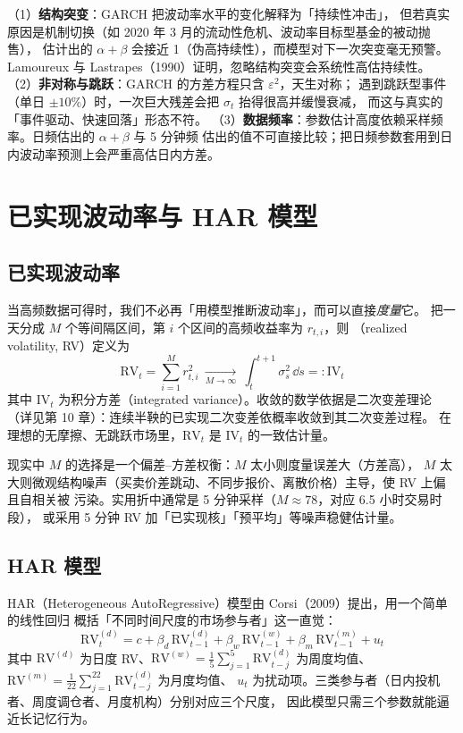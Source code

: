 \begin{warningbox}
（1）\textbf{结构突变}：GARCH 把波动率水平的变化解释为「持续性冲击」，
但若真实原因是机制切换（如 2020 年 3 月的流动性危机、波动率目标型基金的被动抛售），
估计出的 $\alpha+\beta$ 会接近 1（伪高持续性），而模型对下一次突变毫无预警。
Lamoureux 与 Lastrapes（1990）证明，忽略结构突变会系统性高估持续性。
（2）\textbf{非对称与跳跃}：GARCH 的方差方程只含 $\varepsilon^2$，天生对称；
遇到跳跃型事件（单日 $\pm10\%$）时，一次巨大残差会把 $\sigma_t$ 抬得很高并缓慢衰减，
而这与真实的「事件驱动、快速回落」形态不符。
（3）\textbf{数据频率}：参数估计高度依赖采样频率。日频估出的 $\alpha+\beta$ 与 5 分钟频
估出的值不可直接比较；把日频参数套用到日内波动率预测上会严重高估日内方差。
\end{warningbox}

\section{已实现波动率与 HAR 模型}

\subsection{已实现波动率}

当高频数据可得时，我们不必再「用模型推断波动率」，而可以直接\emph{度量}它。
把一天分成 $M$ 个等间隔区间，第 $i$ 个区间的高频收益率为 $r_{t,i}$，则
（realized volatility, RV）定义为
\begin{equation}\label{eq:09-rv}
  \mathrm{RV}_t=\sum_{i=1}^{M}r_{t,i}^{2}\ \xrightarrow[M\to\infty]{}\
  \int_{t}^{t+1}\sigma_s^{2}\,\dd s=:\mathrm{IV}_t
\end{equation}
其中 $\mathrm{IV}_t$ 为积分方差（integrated variance）。收敛的数学依据是二次变差理论
（详见第 10 章）：连续半鞅的已实现二次变差依概率收敛到其二次变差过程。
在理想的无摩擦、无跳跃市场里，$\mathrm{RV}_t$ 是 $\mathrm{IV}_t$ 的一致估计量。

现实中 $M$ 的选择是一个偏差--方差权衡：$M$ 太小则度量误差大（方差高），
$M$ 太大则微观结构噪声（买卖价差跳动、不同步报价、离散价格）主导，使 RV 上偏且自相关被
污染。实用折中通常是 5 分钟采样（$M\approx 78$，对应 6.5 小时交易时段），
或采用 5 分钟 RV 加「已实现核」「预平均」等噪声稳健估计量。

\subsection{HAR 模型}

HAR（Heterogeneous AutoRegressive）模型由 Corsi（2009）提出，用一个简单的线性回归
概括「不同时间尺度的市场参与者」这一直觉：
\begin{equation}\label{eq:09-har}
  \mathrm{RV}_t^{(d)}=c+\beta_d\,\mathrm{RV}_{t-1}^{(d)}
   +\beta_w\,\mathrm{RV}_{t-1}^{(w)}
   +\beta_m\,\mathrm{RV}_{t-1}^{(m)}+u_t
\end{equation}
其中 $\mathrm{RV}^{(d)}$ 为日度 RV、$\mathrm{RV}^{(w)}=\frac{1}{5}\sum_{j=1}^{5}\mathrm{RV}_{t-j}^{(d)}$
为周度均值、$\mathrm{RV}^{(m)}=\frac{1}{22}\sum_{j=1}^{22}\mathrm{RV}_{t-j}^{(d)}$ 为月度均值、
$u_t$ 为扰动项。三类参与者（日内投机者、周度调仓者、月度机构）分别对应三个尺度，
因此模型只需三个参数就能逼近长记忆行为。

